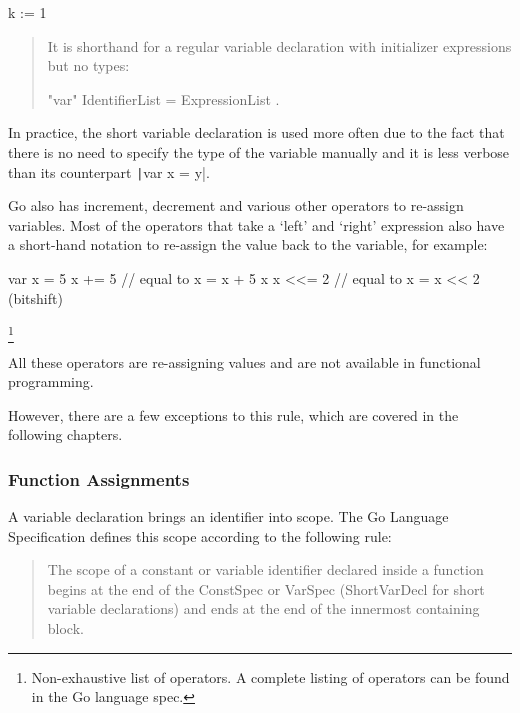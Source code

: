 \begin{gocode}
	k := 1
\end{gocode}

\begin{quote}
It is shorthand for a regular variable declaration with initializer expressions but no types:

\begin{bnfcode}
"var" IdentifierList = ExpressionList .
\end{bnfcode}
\end{quote}\autocite{short-hand-decl}

In practice, the short variable declaration is used more often due to the
fact that there is no need to specify the type of the variable manually and
it is less verbose than its counterpart \texttt|var x = y|.

Go also has increment, decrement and various other operators to re-assign
variables. Most of the operators that take a `left' and `right' expression
also have a short-hand notation to re-assign the value back to the variable,
for example:

\begin{code}
\begin{gocode}
	var x = 5
	x += 5 // equal to x = x + 5
	x %
	x <<= 2 // equal to x = x << 2 (bitshift)
\end{gocode}
\end{code}\footnote{Non-exhaustive list of operators. A complete listing
of operators can be found in the Go language spec\autocite{spec-operators}.}

All these operators are re-assigning values and are not available in functional
programming.

However, there are a few exceptions to this rule, which are covered in the
following chapters.

\subsubsection{Function Assignments}\label{sec:func-reassign}

A variable declaration brings an identifier into scope. The Go Language Specification
defines this scope according to the following rule:
\begin{quote}
    The scope of a constant or variable identifier declared inside a function begins
    at the end of the ConstSpec or VarSpec (ShortVarDecl for short variable
    declarations) and ends at the end of the innermost containing block.
\autocite{spec-scope}\end{quote}

